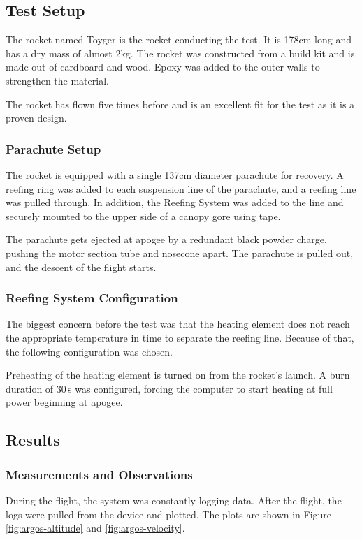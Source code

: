 \subsection{Test Setup}
The rocket named Toyger is the rocket conducting the test. It is 178cm long and has a dry mass of almost 2kg. The rocket was constructed from a build kit and is made out of cardboard and wood. Epoxy was added to the outer walls to strengthen the material.

The rocket has flown five times before and is an excellent fit for the test as it is a proven design. 
\subsubsection{Parachute Setup}
The rocket is equipped with a single 137cm diameter parachute for recovery. A reefing ring was added to each suspension line of the parachute, and a reefing line was pulled through. In addition, the Reefing System was added to the line and securely mounted to the upper side of a canopy gore using tape. 

The parachute gets ejected at apogee by a redundant black powder charge, pushing the motor section tube and nosecone apart. The parachute is pulled out, and the descent of the flight starts. 

\subsubsection{Reefing System Configuration}
The biggest concern before the test was that the heating element does not reach the appropriate temperature in time to separate the reefing line. Because of that, the following configuration was chosen.

Preheating of the heating element is turned on from the rocket's launch. A burn duration of 30\,s was configured, forcing the computer to start heating at full power beginning at apogee. 

\subsection{Results}

\subsubsection{Measurements and Observations}
During the flight, the system was constantly logging data. After the flight, the logs were pulled from the device and plotted. The plots are shown in Figure \ref{fig:argos-altitude} and \ref{fig:argos-velocity}. 

